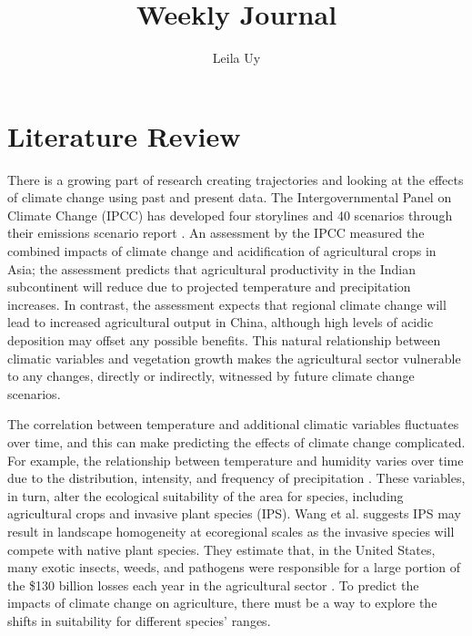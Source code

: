 \documentclass[a4paper,10pt]{article}
\title{Weekly Journal}
\author{Leila Uy}
\begin{document}
\maketitle

% 

\section{Literature Review}

There is a growing part of research creating trajectories and looking at the effects of climate change using past and present data. The Intergovernmental Panel on Climate Change (IPCC) has developed four storylines and 40 scenarios through their emissions scenario report \cite{IPCC2000emissions}.  An assessment by the IPCC measured the combined impacts of climate change and acidification of agricultural crops in Asia; the assessment predicts that agricultural productivity in the Indian subcontinent will reduce due to projected temperature and precipitation increases. In contrast, the assessment expects that regional climate change will lead to increased agricultural output in China, although high levels of acidic deposition may offset any possible benefits. This natural relationship between climatic variables and vegetation growth makes the agricultural sector vulnerable to any changes, directly or indirectly, witnessed by future climate change scenarios. 

The correlation between temperature and additional climatic variables fluctuates over time, and this can make predicting the effects of climate change complicated. For example, the relationship between temperature and humidity varies over time due to the distribution, intensity, and frequency of precipitation \cite{peng2017economic}. These variables, in turn, alter the ecological suitability of the area for species, including agricultural crops and invasive plant species (IPS). Wang et al. \cite{wang2019potential} suggests IPS  may result in landscape homogeneity at ecoregional scales as the invasive species will compete with native plant species. They estimate that, in the United States, many exotic insects, weeds, and pathogens were responsible for a large portion of the \$130 billion losses each year in the agricultural sector \cite{carruthers2003invasive}. To predict the impacts of climate change on agriculture, there must be a way to explore the shifts in suitability for different species' ranges. 
\end{document}
